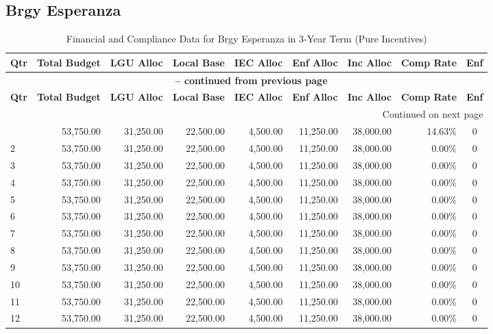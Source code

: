 \subsection{Brgy Esperanza}
\begin{longtable}{lrrrrrrrc}
\caption{Financial and Compliance Data for Brgy Esperanza in 3-Year Term (Pure Incentives)} \\
\toprule
\textbf{Qtr} & \textbf{Total Budget} & \textbf{LGU Alloc} & \textbf{Local Base} & \textbf{IEC Alloc} & \textbf{Enf Alloc} & \textbf{Inc Alloc} & \textbf{Comp Rate} & \textbf{Enf} \\
\midrule
\endfirsthead
\multicolumn{9}{c}{{\bfseries \tablename\ \thetable{} -- continued from previous page}} \\
\toprule
\textbf{Qtr} & \textbf{Total Budget} & \textbf{LGU Alloc} & \textbf{Local Base} & \textbf{IEC Alloc} & \textbf{Enf Alloc} & \textbf{Inc Alloc} & \textbf{Comp Rate} & \textbf{Enf} \\
\midrule
\endhead
\hline \multicolumn{9}{r}{{Continued on next page}} \\ \hline
\endfoot
\bottomrule
\endlastfoot
1 & 53,750.00 & 31,250.00 & 22,500.00 & 4,500.00 & 11,250.00 & 38,000.00 & 14.63\% & 0 \\
2 & 53,750.00 & 31,250.00 & 22,500.00 & 4,500.00 & 11,250.00 & 38,000.00 & 0.00\% & 0 \\
3 & 53,750.00 & 31,250.00 & 22,500.00 & 4,500.00 & 11,250.00 & 38,000.00 & 0.00\% & 0 \\
4 & 53,750.00 & 31,250.00 & 22,500.00 & 4,500.00 & 11,250.00 & 38,000.00 & 0.00\% & 0 \\
5 & 53,750.00 & 31,250.00 & 22,500.00 & 4,500.00 & 11,250.00 & 38,000.00 & 0.00\% & 0 \\
6 & 53,750.00 & 31,250.00 & 22,500.00 & 4,500.00 & 11,250.00 & 38,000.00 & 0.00\% & 0 \\
7 & 53,750.00 & 31,250.00 & 22,500.00 & 4,500.00 & 11,250.00 & 38,000.00 & 0.00\% & 0 \\
8 & 53,750.00 & 31,250.00 & 22,500.00 & 4,500.00 & 11,250.00 & 38,000.00 & 0.00\% & 0 \\
9 & 53,750.00 & 31,250.00 & 22,500.00 & 4,500.00 & 11,250.00 & 38,000.00 & 0.00\% & 0 \\
10 & 53,750.00 & 31,250.00 & 22,500.00 & 4,500.00 & 11,250.00 & 38,000.00 & 0.00\% & 0 \\
11 & 53,750.00 & 31,250.00 & 22,500.00 & 4,500.00 & 11,250.00 & 38,000.00 & 0.00\% & 0 \\
12 & 53,750.00 & 31,250.00 & 22,500.00 & 4,500.00 & 11,250.00 & 38,000.00 & 0.00\% & 0 \\
\end{longtable}
\newpage
